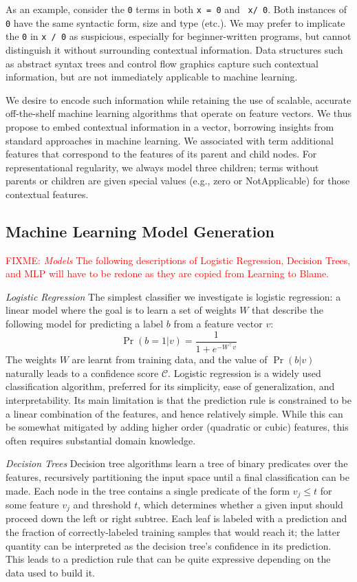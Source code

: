 \documentclass[conference]{IEEEtran}
\newcommand{\fixme}[1]{\textcolor{red}{FIXME: #1}}
\newcommand\lt[1]{{\lstinline|#1|}}
\begin{document}
As an example, consider the \lt{0} terms in both \lt{x = 0} and \lt{ x/ 0}.
Both instances of \lt{0} have the same syntactic form, size and type
(etc.). We may prefer to implicate the \lt{0} in \lt{x / 0} as suspicious,
especially for beginner-written programs, but cannot distinguish it without
surrounding contextual information. Data structures such as abstract syntax
trees and control flow graphics capture such contextual information, but
are not immediately applicable to machine learning. 

We desire to encode such information while retaining the use of scalable,
accurate off-the-shelf machine learning algorithms that operate on feature
vectors. We thus propose to embed contextual information in a vector,
borrowing insights from standard approaches in machine learning. We
associated with term additional features that correspond to the features of
its parent and child nodes. For representational regularity, we always
model three children; terms without parents or children are given special
values (e.g., zero or NotApplicable) for those contextual features. 

\subsection{Machine Learning Model Generation}
\label{sec-model} 

\fixme{
\emph{Models} The following descriptions of Logistic Regression, Decision Trees,
and MLP will have to be redone as they are copied from Learning to Blame.
}

\emph{Logistic Regression}
The simplest classifier we investigate is logistic regression:
a linear model where the goal is to learn a set of weights $W$
that describe the following model for predicting a label
$b$ from a feature vector $v$:
%
\[ \Pr(b = 1 | v) = \frac{1}{1 + e^{-W^{\top} v}} \]
%
The weights $W$ are learnt from training data, and the value of
$\Pr(b | v)$ naturally leads to a confidence score $\mathcal{C}$.
%
Logistic regression is a widely used classification algorithm, preferred
for its simplicity, ease of generalization, and interpretability.
%
Its main limitation is that the prediction rule is constrained to be a
linear combination of the features, and hence relatively simple.
%
While this can be somewhat mitigated by adding higher order (quadratic
or cubic) features, this often requires substantial domain knowledge.

\emph{Decision Trees}
Decision tree algorithms learn a tree of binary predicates over the
features, recursively partitioning the input space until a final
classification can be made.
%
Each node in the tree contains a single predicate of the form
$v_j \leq t$ for some feature $v_j$ and threshold $t$, which determines
whether a given input should proceed down the left or right subtree.
%
Each leaf is labeled with a prediction and the fraction of
correctly-labeled training samples that would reach it; the latter
quantity can be interpreted as the decision tree's confidence in its
prediction.
%
This leads to a prediction rule that can be quite expressive depending
on the data used to build it.
\end{document}
